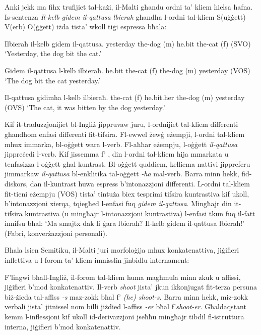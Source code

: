 \documentclass[]{../../metanetpaper}
\begin{document}
\begin{multicols}{2}

Anki jekk ma fihx trufijiet tal-każi, il-Malti għandu ordni ta’ kliem ħielsa ħafna. Is-sentenza \emph{Il-kelb gidem il-qattusa lbieraħ} għandha l-ordni tal-kliem S(uġġett) V(erb) O(ġġett) iżda tista’ wkoll tiġi espressa bħala:

\begin{examples}\label{WO_no_clitics}
\item
\gll Ilbieraħ il-kelb gidem il-qattusa.
yesterday	{the-dog (m)} he.bit	{the-cat (f)}
\gln (SVO)
\glt `Yesterday, the dog bit the cat.'
\glend

\item
\gll Gidem il-qattusa l-kelb ilbieraħ.
he.bit {the-cat (f)} {the-dog (m)} yesterday
\gln (VOS)
\glt `The dog bit the cat yesterday.'
\glend

\item
\gll Il-qattusa gidimha l-kelb ilbieraħ.
{the-cat (f)} he.bit.her {the-dog (m)} yesterday
\gln (OVS)
\glt `The cat, it was bitten by the dog yesterday.'
\glend
\end{examples}

Kif it-traduzzjonijiet bl-Ingliż jippruvaw juru, l-ordnijiet tal-kliem differenti għandhom enfasi differenti fit-tifsira. Fl-ewwel żewġ eżempji, l-ordni tal-kliem mhux immarka, bl-oġġett wara l-verb. Fl-aħħar eżempju, l-oġġett \emph{il-qattusa} jippreċedi l-verb. Kif jissemma f' \cite{Fabri:1993}, din l-ordni tal-kliem hija mmarkata u tenfasizza l-oġġett għal kuntrast. Bl-oġġett quddiem, kelliema nattivi jippreferu jimmarkaw \emph{il-qattusa} bl-enklitika tal-oġġett \emph{-ha} mal-verb. Barra minn hekk, fid-diskors, dan il-kuntrast huwa espress b’intonazzjoni differenti. L-ordni tal-kliem fit-tieni eżempju (VOS) tista’ tintuża biex tesprimi tifsira kuntrastiva kif ukoll, b’intonazzjoni xierqa, tqiegħed l-enfasi fuq \emph{gidem il-qattusa}. Mingħajr din it-tifsira kuntrastiva (u mingħajr l-intonazzjoni kuntrastiva) l-enfasi tkun fuq il-fatt innifsu bħal: `Ma smajtx dak li ġara lbieraħ? Il-kelb gidem il-qattusa lbieraħ!' (Fabri, konverżazzjoni personali).


Bħala lsien Semitiku, il-Malti juri morfoloġija mhux konkatenattiva, jiġifieri inflettiva u l-forom ta’ kliem imnisslin jinbidlu internament:

F’lingwi bħall-Ingliż, il-forom tal-kliem huma magħmula minn zkuk u affissi, jiġifieri b’mod konkatenattiv. Il-verb \emph{shoot} jista’ jkun ikkonjugat fit-terza persuna biż-żieda tal-affiss \emph{-s} maz-zokk bħal f’ \emph{(he) shoot-s}. Barra minn hekk, miz-zokk verbali jista’ jitnissel nom billi jiżdied l-affiss \emph{-er} bħal f’\emph{shoot-er}. Għaldaqstant kemm l-inflessjoni kif ukoll id-derivazzjoni jseħħu mingħajr tibdil fl-istruttura interna, jiġifieri b’mod konkatenattiv. 


\end{multicols}
\end{document}

